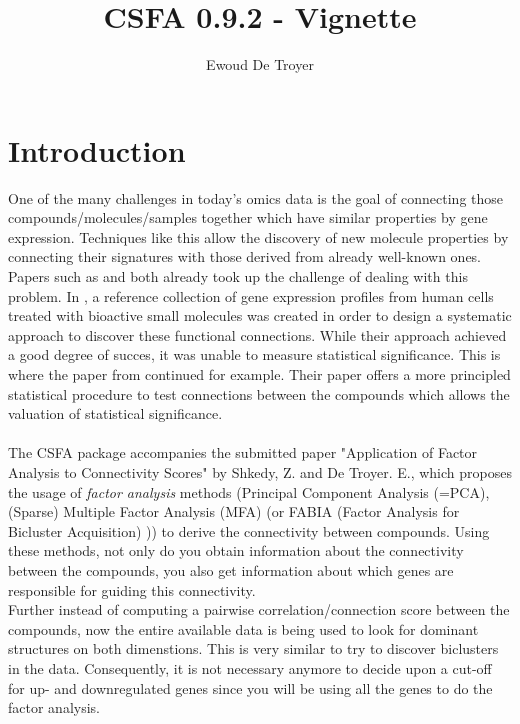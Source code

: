\documentclass[a4paper]{article}\usepackage[]{graphicx}\usepackage[]{color}
\title{CSFA 0.9.2 - Vignette}
\date{}
\author{Ewoud De Troyer}
\begin{document}
\maketitle
\section{Introduction}

One of the many challenges in today's omics data is the goal of connecting those
compounds/molecules/samples together which have similar properties by gene
expression.
Techniques like this allow the discovery of new molecule properties by
connecting their signatures with those derived from already well-known ones.\\
Papers such as \citet{Lamb2006} and \citet{Zhang2008} both already took up the
challenge of dealing with this problem. In \citet{Lamb2006}, a reference
collection of gene expression profiles from human cells treated with bioactive
small molecules was created in order to design a systematic approach to discover
these functional connections. While their approach achieved a good degree of
succes, it was unable to measure statistical significance. This is where the
paper from \citet{Zhang2008} continued for example. Their paper offers a more
principled statistical procedure to test connections between the compounds which allows the valuation of statistical significance.
\\ \\
The CSFA package accompanies the submitted paper "Application of Factor Analysis to Connectivity Scores" by Shkedy, Z. and De Troyer. E., which proposes the usage of {\it factor analysis} methods (Principal Component
Analysis (=PCA), (Sparse) Multiple Factor Analysis (MFA) \citep{Abdi2013} 
(or FABIA (Factor Analysis for Bicluster Acquisition) \citep{Hochreiter2010})) to derive the connectivity between compounds.
Using these methods, not only do you obtain information about the connectivity between the compounds, you also get
information about which genes are responsible for guiding this connectivity.\\
Further instead of computing a pairwise correlation/connection score between the
compounds, now the entire available data is being used to look for dominant structures on both dimenstions. This is very similar to try to discover biclusters in the data. Consequently, it is not necessary anymore to decide upon a cut-off for up- and downregulated genes since you will be using all the genes to do the factor analysis.
\end{document}
